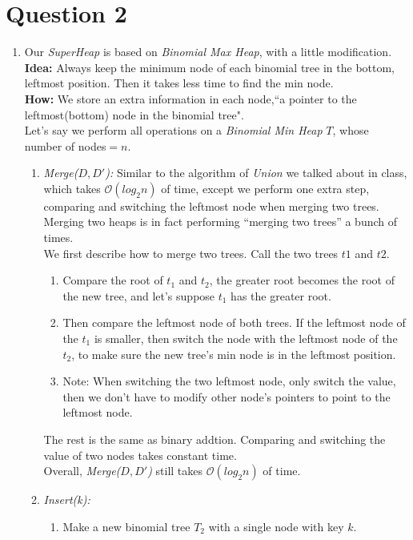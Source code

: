 \documentclass[10pt]{article}
\begin{document}
\section*{Question 2}
\begin{enumerate}
\item
Our \textit{SuperHeap} is based on \textit{Binomial Max Heap}, with a little modification.\\
\textbf{Idea:} Always keep the minimum node of each binomial tree in the bottom, leftmost position. Then it takes less time to find the min node.\\
\textbf{How:} We store an extra information in each node,``a pointer to the leftmost(bottom) node in the binomial tree".\\
Let's say we perform all operations on a \textit{Binomial Min Heap} $T$, whose number of nodes$=n$.
\begin{enumerate}
\item \textit{Merge($D, D'$):}
Similar to the algorithm of \textit{Union} we talked about in class, which takes $\mathcal{O}(log_2n)$ of time, except we perform one extra step, comparing and switching the leftmost node when merging two trees.\\
Merging two heaps is in fact performing ``merging two trees'' a bunch of times. \\
We first describe how to merge two trees. Call the two trees $t1$ and $t2$.
\begin{enumerate}
\item Compare the root of $t_1$ and $t_2$, the greater root becomes the root of the new tree, and let's suppose $t_1$ has the greater root.
\item Then compare the leftmost node of both trees. If the leftmost node of the $t_1$ is smaller, then switch the node with the leftmost node of the $t_2$, to make sure the new tree's min node is in the leftmost position.
\item Note: When switching the two leftmost node, only switch the value, then we don't have to modify other node's pointers to point to the leftmost node.
\end{enumerate}
The rest is the same as binary addtion. Comparing and switching the value of two nodes takes constant time. \\
Overall, \textit{Merge($D, D'$)} still takes $\mathcal{O}(log_2n)$ of time.
\item \textit{Insert(k):} 
\begin{enumerate}
\item Make a new binomial tree $T_2$ with a single node with key $k$.

\end{enumerate}
\end{enumerate}
\end{enumerate}
\end{document}
